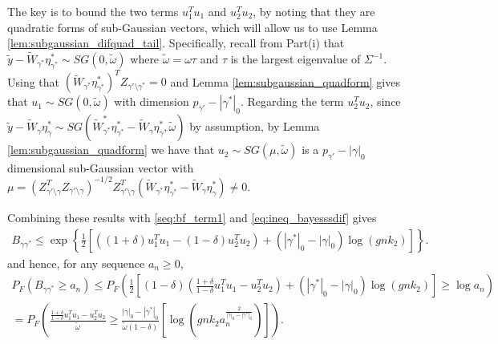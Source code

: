 The key is to bound the two terms $u_1^Tu_1$ and $u_2^Tu_2$, by noting that they are quadratic forms of sub-Gaussian vectors, which will allow us to use Lemma \ref{lem:subgaussian_difquad_tail}.
Specifically, recall from Part(i) that $\tilde{y} - \widetilde{W}_{\gamma^*} \eta_{\gamma^*}^* \sim SG(0, \tilde{\omega})$ where $\tilde{\omega}= \omega \tau$ and $\tau$ is the largest eigenvalue of $\Sigma^{-1}$.
Using that $(\widetilde{W}_{\gamma^*} \eta_{\gamma^*}^*)^T Z_{\gamma' \setminus \gamma^*}=0$ and Lemma \ref{lem:subgaussian_quadform} gives that
$u_1 \sim SG(0, \tilde{\omega})$ with dimension $p_{\gamma'}-|\gamma^*|_0$.
Regarding the term $u_2^T u_2$, since $\tilde{y} - \widetilde{W}_\gamma \eta_\gamma^* \sim SG(\widetilde{W}_{\gamma^*}^* \eta_{\gamma^*}^* - \widetilde{W}_\gamma \eta_\gamma^*, \tilde{\omega})$ by assumption, by Lemma \ref{lem:subgaussian_quadform} we have that $u_2 \sim SG(\mu,\tilde{\omega})$ is a $p_{\gamma'}-|\gamma|_0$ dimensional sub-Gaussian vector with 
$\mu= (Z_{\gamma' \setminus \gamma}^T Z_{\gamma' \setminus \gamma})^{-1/2} Z_{\gamma' \setminus \gamma}^T (\widetilde{W}_{\gamma^*} \eta_{\gamma^*}^* - \widetilde{W}_\gamma \eta_\gamma^*) \neq 0$.

Combining these results with \eqref{seq:bf_term1} and \eqref{eq:ineq_bayesssdif} gives
\begin{align}
B_{\gamma \gamma^*} \leq
\exp \left\{  \frac{1}{2} \left[  ((1 + \delta) u_1^Tu_1 - (1 - \delta) u_2^Tu_2) + (|\gamma^*|_0-|\gamma|_0) \log(g n k_2) \right] \right\}.
\nonumber
\end{align}
and hence, for any sequence $a_n \geq 0$,
\begin{align}
 P_F \left( B_{\gamma \gamma^*} \geq a_n  \right) \leq
P_F \left( \frac{1}{2} \left[ (1 - \delta) \left( \frac{1+\delta}{1-\delta} u_1^Tu_1 - u_2^Tu_2 \right) + (|\gamma^*|_0-|\gamma|_0) \log(g n k_2) \right] \geq \log a_n \right)
\nonumber \\
= 
P_F \left( \frac{\frac{1+\delta}{1-\delta} u_1^Tu_1 - u_2^Tu_2}{\tilde{\omega}}  \geq \frac{|\gamma|_0 - |\gamma^*|_0}{\tilde{\omega} (1 - \delta)} \left[\log(g n k_2 a_n^{\frac{2}{|\gamma|_0 - |\gamma^*|_0}}) \right] \right).
\label{seq:bftailprob_notsubsetcase}
\end{align}

